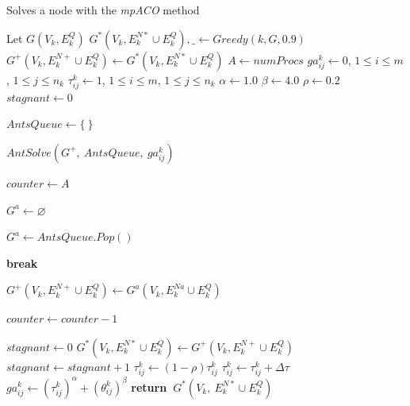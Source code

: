 \documentclass[preprint,authoryear]{elsarticle}
\newcommand{\Break}{\State \bf {break}}
\renewcommand{\Return}{\State \bf {return}~}
\begin{document}
\begin{algorithm}[H] 
	
	
	\caption{ Solves a node with the {\it mpACO} method } \label{alg:aco}
	\begin{algorithmic}[1]
		
		
		\State Let $G(V_k, E^Q_k)$ 
		\State $G^*(V_k, E^{N*}_k \cup E^Q_k), \_ \gets Greedy(k, G, 0.9)$  \label{aco:greedy} 
		\State $G^+(V_k, E^{N+}_k \cup E^Q_k) \gets G^*(V_k,E^{N*}_k \cup E^Q_k)$
		\State $A \gets numProcs$ \label{aco:numProcs}
		\State $ga^k_{ij}   \gets 0$, $1 \leq i \leq m$, $1 \leq j \leq n_k$  \label{aco:init1}
		\State $\tau^k_{ij} \gets 1$, $1 \leq i \leq m$, $1 \leq j \leq n_k$   \label{aco:init2}
		\State $\alpha    \gets 1.0$ \label{aco:alpha}
		\State $\beta     \gets 4.0$ \label{aco:beta}
		\State $\rho      \gets 0.2$ \label{aco:rho}
		\State $stagnant \gets 0$
		 \label{aco:while}
					
			\State $AntsQueue \gets \{\ \}$ \label{aco:AntsQueue}

			 \label{aco:AntsSolve}	
				\State $AntSolve(G^+,\ AntsQueue,\ ga^k_{ij})$
			\EndFor
			
			\State $counter \gets A$
						
			 \label{aco:while2}
			
				\State $G^{a} \gets \varnothing$
			
				 
			
					\State $G^{a} \gets AntsQueue.Pop()$
					
						\Break
					\EndIf
				
				\EndWhile
					
				\If{$f_s(G^{a}) > f_s(G^{+})$}
					\State $G^+(V_k, E^{N+}_k \cup E^Q_k) \gets G^a(V_k, E^{Na}_k \cup E^Q_k)$ 
				\EndIf
				
				\State $counter \gets counter - 1$
												
			\EndWhile			
									
			 \label{aco:best1}
				\State $stagnant \gets 0$
				\State $G^*(V_k, E^{N*}_k \cup E^Q_k) \gets G^+(V_k, E^{N+}_k \cup E^Q_k)$		
			\Else
				\State $stagnant \gets stagnant + 1$ 
			\EndIf
			\For{all $\tau^k_{ij}$} 
				\State $\tau^k_{ij} \gets (1-\rho)\tau^k_{ij}$ \label{aco:rho2}
				\State $\tau^k_{ij} \gets \tau^k_{ij} + \Delta\tau$ \label{aco:phero2}
				\State $ga^k_{ij} \gets (\tau^k_{ij})^\alpha + (\theta^k_{ij})^\beta$ \label{aco:ga2}				
			\EndFor	
		\EndWhile	
		\Return $G^*(V_k,\ E^{N*}_k \cup E^Q_k)$
		
		\EndProcedure		
	\end{algorithmic}
\end{algorithm}
	
\end{document}
